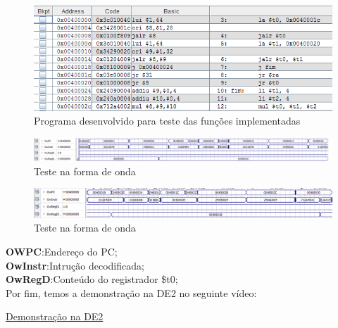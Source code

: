 \documentclass[12pt]{article}
\begin{document}
\begin{figure}[H]
	\flushleft
	\includegraphics[width=1\textwidth]{programa.png}
	\caption{Programa desenvolvido para teste das funções implementadas}
	\label{fig:pest}
\end{figure}
\begin{figure}[H]
	\flushleft
	\includegraphics[width=1\textwidth]{teste.png}
	\caption{Teste na forma de onda}
	\label{fig:pest}
\end{figure}
\begin{figure}[H]
	\flushleft
	\includegraphics[width=1\textwidth]{images/teste1.png}
	\caption{Teste na forma de onda}
	\label{fig:pest}
\end{figure}


\textbf{OWPC}:Endereço do PC;\\
\textbf{OwInstr}:Intrução decodificada;\\
\textbf{OwRegD}:Conteúdo do registrador \$t0;\\



Por fim, temos a demonstração na DE2 no seguinte vídeo:

\href{https://youtu.be/aTrqM8m8FJc}{Demonstração na DE2}



\end{document}
